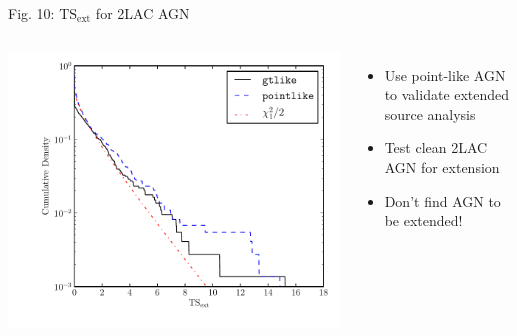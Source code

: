 \documentclass[12pt]{beamer}
\begin{document}
\begin{frame}{Fig. 10: $\text{TS}_\text{ext}$ for 2LAC AGN}
  \begin{columns}
    \includegraphics[scale=0.45]{plots/agn_color.pdf}
    \begin{itemize}
      \item Use point-like AGN to validate extended source analysis
      \item Test clean 2LAC AGN for extension
      \item Don't find AGN to be extended!
    \end{itemize}
  \end{columns}
\end{frame}
\end{document}
